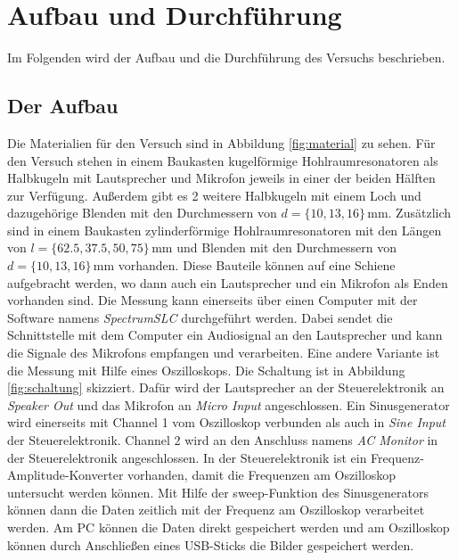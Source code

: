 \section{Aufbau und Durchführung}
\label{sec:auf_durch}

Im Folgenden wird der Aufbau und die Durchführung des Versuchs beschrieben.

\subsection{Der Aufbau}
\label{sec:aufbau}

Die Materialien für den Versuch sind in Abbildung \ref{fig:material} zu sehen. Für den Versuch stehen in einem Baukasten kugelförmige Hohlraumresonatoren als Halbkugeln mit Lautsprecher und Mikrofon jeweils in einer der beiden Hälften zur Verfügung. Außerdem gibt es 2 weitere Halbkugeln mit einem Loch und dazugehörige Blenden mit den Durchmessern von $d = \{ 10, 13, 16 \} \, \mathrm{mm}$. Zusätzlich sind in einem Baukasten zylinderförmige Hohlraumresonatoren mit den Längen von $l = \{62.5,37.5, 50, 75\} \, \mathrm{mm}$ und Blenden mit den Durchmessern von $d = \{ 10, 13, 16 \} \, \mathrm{mm}$ vorhanden. Diese Bauteile können auf eine Schiene aufgebracht werden, wo dann auch ein Lautsprecher und ein Mikrofon als Enden vorhanden sind. Die Messung kann einerseits über einen Computer mit der Software namens \textit{SpectrumSLC} durchgeführt werden. Dabei sendet die Schnittstelle mit dem Computer ein Audiosignal an den Lautsprecher und kann die Signale des Mikrofons empfangen und verarbeiten. Eine andere Variante ist die Messung mit Hilfe eines Oszilloskops. Die Schaltung ist in Abbildung \ref{fig:schaltung} skizziert. Dafür wird der Lautsprecher an der Steuerelektronik an \textit{Speaker Out} und das Mikrofon an \textit{Micro Input} angeschlossen. Ein Sinusgenerator wird einerseits mit Channel 1 vom Oszilloskop verbunden als auch in \textit{Sine Input} der Steuerelektronik. Channel 2 wird an den Anschluss namens \textit{AC Monitor} in der Steuerelektronik angeschlossen. In der Steuerelektronik ist ein Frequenz-Amplitude-Konverter vorhanden, damit die Frequenzen am Oszilloskop untersucht werden können. Mit Hilfe der sweep-Funktion des Sinusgenerators können dann die Daten zeitlich mit der Frequenz am Oszilloskop verarbeitet werden. Am PC können die Daten direkt gespeichert werden und am Oszilloskop können durch Anschließen eines USB-Sticks die Bilder gespeichert werden.

